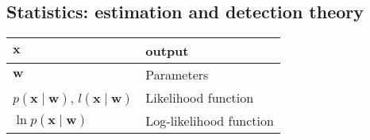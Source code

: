 \subsection{Statistics: estimation and detection theory}
\begin{xltabular}{\textwidth}{XX}
	\(\mathbf{x}\)                                                                                                                                                                                                                                                                                               & output                                                                                                                                                                                                                                                                \\ \hline
	\(\mathbf{w}\)                                                                                                                                                                                                                                                                                               & Parameters                                                                                                                                                                                                                                                            \\ \hline
	\(p(\mathbf{x} \mid \mathbf{w})\), \(l(\mathbf{x} \mid \mathbf{w})\)\cite{leon-garciaProbabilityStatisticsRandom2007}                                                                                                                                                                                        & Likelihood function                                                                                                                                                                                                                                                   \\ \hline
	\(\ln{p(\mathbf{x} \mid \mathbf{w})}\)                                                                                                                                                                                                                                                                       & Log-likelihood function                                                                                                                                                                                                                                               \\ \hline

\end{xltabular}
